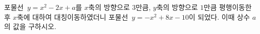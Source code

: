 포물선~$y=x^2-2x+a$를 $x$축의 방향으로 $3$만큼, $y$축의 방향으로 $1$만큼 평행이동한 후 $x$축에 대하여 대칭이동하였더니 포물선~$y=-x^2+8x-10$이 되었다. 이때 상수 $a$의 값을 구하시오.
